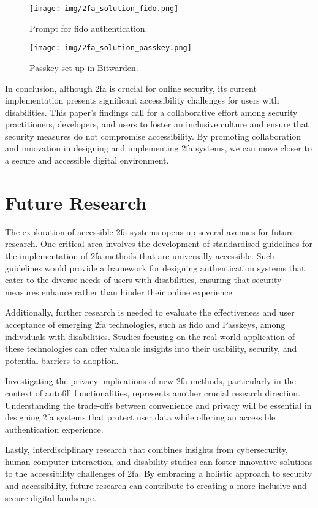 {\begin{figure}[t]
    \centering
    \texttt{[image: img/2fa\_solution\_fido.png]}
    \caption[Caption]{Prompt for \ac{fido} authentication.\footnotemark{}}
    \label{fig:fido-prompt}
\end{figure}
}

{\begin{figure}[t]
    \centering
    \texttt{[image: img/2fa\_solution\_passkey.png]}
    \caption[Caption]{Passkey set up in Bitwarden.\footnotemark{}}
    \label{fig:passkey-setup}
\end{figure}
}

In conclusion, although \ac{2fa} is crucial for online security, its current implementation presents significant accessibility challenges for users with disabilities. This paper's findings call for a collaborative effort among security practitioners, developers, and users to foster an inclusive culture and ensure that security measures do not compromise accessibility. By promoting collaboration and innovation in designing and implementing \ac{2fa} systems, we can move closer to a secure and accessible digital environment.

\section{Future Research}
\label{sec:outlook}

The exploration of accessible \ac{2fa} systems opens up several avenues for future research. One critical area involves the development of standardised guidelines for the implementation of \ac{2fa} methods that are universally accessible. Such guidelines would provide a framework for designing authentication systems that cater to the diverse needs of users with disabilities, ensuring that security measures enhance rather than hinder their online experience.

Additionally, further research is needed to evaluate the effectiveness and user acceptance of emerging \ac{2fa} technologies, such as \ac{fido} and Passkeys, among individuals with disabilities. Studies focusing on the real-world application of these technologies can offer valuable insights into their usability, security, and potential barriers to adoption.

Investigating the privacy implications of new \ac{2fa} methods, particularly in the context of autofill functionalities, represents another crucial research direction. Understanding the trade-offs between convenience and privacy will be essential in designing \ac{2fa} systems that protect user data while offering an accessible authentication experience.

Lastly, interdisciplinary research that combines insights from cybersecurity, human-computer interaction, and disability studies can foster innovative solutions to the accessibility challenges of \ac{2fa}. By embracing a holistic approach to security and accessibility, future research can contribute to creating a more inclusive and secure digital landscape.
